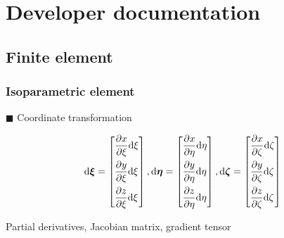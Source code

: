\chapter{Developer documentation}

\section{Finite element}

\subsection{Isoparametric element}

$\blacksquare$ Coordinate transformation \cite{XuchengWang2003}

\begin{equation}
{\text{d}} {\bm{\xi}}  = \left[ \begin{gathered}
  \frac{{\partial x}}{{\partial \xi }}{\text{d}}\xi  \hfill \\
  \frac{{\partial y}}{{\partial \xi }}{\text{d}}\xi  \hfill \\
  \frac{{\partial z}}{{\partial \xi }}{\text{d}}\xi  \hfill \\ 
\end{gathered}  \right],{\text{d}} {\bm{\eta}}  = \left[ \begin{gathered}
  \frac{{\partial x}}{{\partial \eta }}{\text{d}}\eta  \hfill \\
  \frac{{\partial y}}{{\partial \eta }}{\text{d}}\eta  \hfill \\
  \frac{{\partial z}}{{\partial \eta }}{\text{d}}\eta  \hfill \\ 
\end{gathered}  \right],{\text{d}} {\bm{\zeta}}  = \left[ \begin{gathered}
  \frac{{\partial x}}{{\partial \zeta }}{\text{d}}\zeta  \hfill \\
  \frac{{\partial y}}{{\partial \zeta }}{\text{d}}\zeta  \hfill \\
  \frac{{\partial z}}{{\partial \zeta }}{\text{d}}\zeta  \hfill \\ 
\end{gathered}  \right]
\end{equation}

Partial derivatives, Jacobian matrix, gradient tensor

